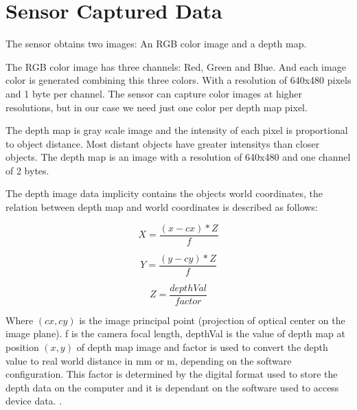 \section{Sensor Captured Data}

The sensor obtains two images: An RGB color image and a depth map.

The RGB color image has three channels: Red, Green and Blue. And each image color is generated 
combining this three colors. With a resolution of 640x480 pixels and 1 byte per channel. The sensor can 
capture color images at higher resolutions, but in our case we need just one color per depth map pixel.


The depth map is gray scale image and the intensity of each pixel is proportional to object distance. 
Most distant objects have greater intensitys than closer objects. The depth map is an image with a resolution of 
640x480 and one channel of 2 bytes.


The depth image data implicity contains the objects world coordinates, the relation between depth map 
and world coordinates is described as follows:

\begin{equation}
\label{eq:disparity2}
 X=\frac{(x-cx)*Z}{f}
\end{equation}

\begin{equation}
\label{eq:disparity2}
 Y=\frac{(y-cy)*Z}{f}
\end{equation}

\begin{equation}
\label{eq:disparity2}
 Z=\frac{depthVal}{factor}
\end{equation}

Where $(cx,cy)$ is the image principal point (projection of optical center on the image plane). f is the camera 
focal length, depthVal is the value of depth map at position $(x,y)$ of depth map image and factor is used to convert 
the depth value to real world distance in mm or m, depending on the software configuration. This factor is determined by 
the digital format used to store the depth data on the 
computer and it is dependant on the software used to access device data.
.


